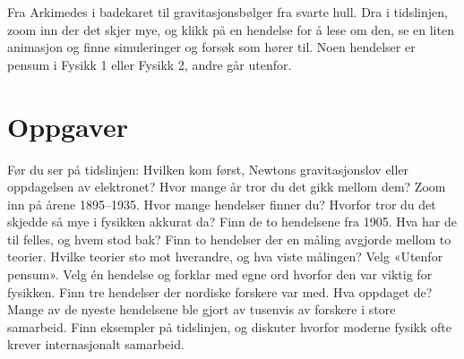 \documentclass[11pt]{article}
\begin{document}

Fra Arkimedes i badekaret til gravitasjonsbølger fra svarte hull. Dra i tidslinjen, zoom inn der det skjer mye, og klikk på en hendelse for å lese om den, se en liten animasjon og finne simuleringer og forsøk som hører til. Noen hendelser er pensum i Fysikk 1 eller Fysikk 2, andre går utenfor.

\section*{Oppgaver}

\begin{oppgaveliste}
\oppgave {}Før du ser på tidslinjen: Hvilken kom først, Newtons gravitasjonslov eller oppdagelsen av elektronet? Hvor mange år tror du det gikk mellom dem?
\svar
\oppgave {}Zoom inn på årene 1895–1935. Hvor mange hendelser finner du? Hvorfor tror du det skjedde så mye i fysikken akkurat da?
\svar
\oppgave {}Finn de to hendelsene fra 1905. Hva har de til felles, og hvem stod bak?
\svar
\oppgave {}Finn to hendelser der en måling avgjorde mellom to teorier. Hvilke teorier sto mot hverandre, og hva viste målingen?
\svar
\oppgave {}Velg «Utenfor pensum». Velg én hendelse og forklar med egne ord hvorfor den var viktig for fysikken.
\svar
\oppgave {}Finn tre hendelser der nordiske forskere var med. Hva oppdaget de?
\svar
\oppgave {}Mange av de nyeste hendelsene ble gjort av tusenvis av forskere i store samarbeid. Finn eksempler på tidslinjen, og diskuter hvorfor moderne fysikk ofte krever internasjonalt samarbeid.
\svar
\end{oppgaveliste}
\end{document}
